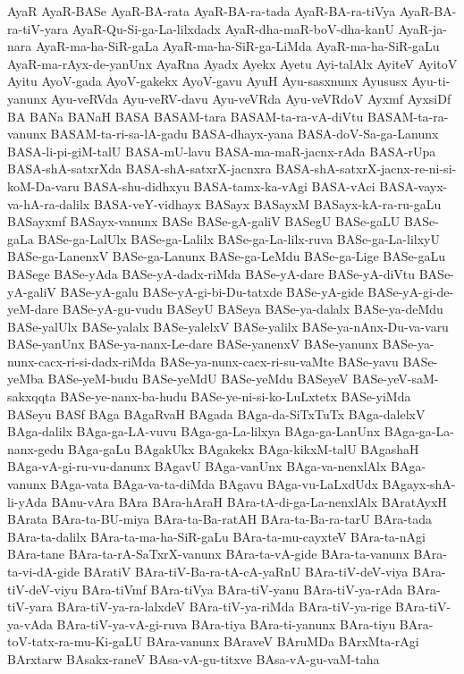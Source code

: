 {AyaR
AyaR-BASe
AyaR-BA-rata
AyaR-BA-ra-tada
AyaR-BA-ra-tiVya
AyaR-BA-ra-tiV-yara
AyaR-Qu-Si-ga-La-lilxdadx
AyaR-dha-maR-boV-dha-kanU
AyaR-ja-nara
AyaR-ma-ha-SiR-gaLa
AyaR-ma-ha-SiR-ga-LiMda
AyaR-ma-ha-SiR-gaLu
AyaR-ma-rAyx-de-yanUnx
AyaRna
Ayadx
Ayekx
Ayetu
Ayi-talAlx
AyiteV
AyitoV
Ayitu
AyoV-gada
AyoV-gakekx
AyoV-gavu
AyuH
Ayu-sasxnunx
Ayususx
Ayu-ti-yanunx
Ayu-veRVda
Ayu-veRV-davu
Ayu-veVRda
Ayu-veVRdoV
Ayxmf
AyxsiDf
BA
BANa
BANaH
BASA
BASAM-tara
BASAM-ta-ra-vA-diVtu
BASAM-ta-ra-vanunx
BASAM-ta-ri-sa-lA-gadu
BASA-dhayx-yana
BASA-doV-Sa-ga-Lanunx
BASA-li-pi-giM-talU
BASA-mU-lavu
BASA-ma-maR-jacnx-rAda
BASA-rUpa
BASA-shA-satxrXda
BASA-shA-satxrX-jacnxra
BASA-shA-satxrX-jacnx-re-ni-si-koM-Da-varu
BASA-shu-didhxyu
BASA-tamx-ka-vAgi
BASA-vAci
BASA-vayx-va-hA-ra-dalilx
BASA-veY-vidhayx
BASayx
BASayxM
BASayx-kA-ra-ru-gaLu
BASayxmf
BASayx-vanunx
BASe
BASe-gA-galiV
BASegU
BASe-gaLU
BASe-gaLa
BASe-ga-LalUlx
BASe-ga-Lalilx
BASe-ga-La-lilx-ruva
BASe-ga-La-lilxyU
BASe-ga-LanenxV
BASe-ga-Lanunx
BASe-ga-LeMdu
BASe-ga-Lige
BASe-gaLu
BASege
BASe-yAda
BASe-yA-dadx-riMda
BASe-yA-dare
BASe-yA-diVtu
BASe-yA-galiV
BASe-yA-galu
BASe-yA-gi-bi-Du-tatxde
BASe-yA-gide
BASe-yA-gi-de-yeM-dare
BASe-yA-gu-vudu
BASeyU
BASeya
BASe-ya-dalalx
BASe-ya-deMdu
BASe-yalUlx
BASe-yalalx
BASe-yalelxV
BASe-yalilx
BASe-ya-nAnx-Du-va-varu
BASe-yanUnx
BASe-ya-nanx-Le-dare
BASe-yanenxV
BASe-yanunx
BASe-ya-nunx-cacx-ri-si-dadx-riMda
BASe-ya-nunx-cacx-ri-su-vaMte
BASe-yavu
BASe-yeMba
BASe-yeM-budu
BASe-yeMdU
BASe-yeMdu
BASeyeV
BASe-yeV-saM-sakxqqta
BASe-ye-nanx-ba-hudu
BASe-ye-ni-si-ko-LuLxtetx
BASe-yiMda
BASeyu
BASf
BAga
BAgaRvaH
BAgada
BAga-da-SiTxTuTx
BAga-dalelxV
BAga-dalilx
BAga-ga-LA-vuvu
BAga-ga-La-lilxya
BAga-ga-LanUnx
BAga-ga-La-nanx-gedu
BAga-gaLu
BAgakUkx
BAgakekx
BAga-kikxM-talU
BAgashaH
BAga-vA-gi-ru-vu-danunx
BAgavU
BAga-vanUnx
BAga-va-nenxlAlx
BAga-vanunx
BAga-vata
BAga-va-ta-diMda
BAgavu
BAga-vu-LaLxdUdx
BAgayx-shA-li-yAda
BAnu-vAra
BAra
BAra-hAraH
BAra-tA-di-ga-La-nenxlAlx
BAratAyxH
BArata
BAra-ta-BU-miya
BAra-ta-Ba-ratAH
BAra-ta-Ba-ra-tarU
BAra-tada
BAra-ta-dalilx
BAra-ta-ma-ha-SiR-gaLu
BAra-ta-mu-cayxteV
BAra-ta-nAgi
BAra-tane
BAra-ta-rA-SaTxrX-vanunx
BAra-ta-vA-gide
BAra-ta-vanunx
BAra-ta-vi-dA-gide
BAratiV
BAra-tiV-Ba-ra-tA-cA-yaRnU
BAra-tiV-deV-viya
BAra-tiV-deV-viyu
BAra-tiVmf
BAra-tiVya
BAra-tiV-yanu
BAra-tiV-ya-rAda
BAra-tiV-yara
BAra-tiV-ya-ra-lalxdeV
BAra-tiV-ya-riMda
BAra-tiV-ya-rige
BAra-tiV-ya-vAda
BAra-tiV-ya-vA-gi-ruva
BAra-tiya
BAra-ti-yanunx
BAra-tiyu
BAra-toV-tatx-ra-mu-Ki-gaLU
BAra-vanunx
BAraveV
BAruMDa
BArxMta-rAgi
BArxtarw
BAsakx-raneV
BAsa-vA-gu-titxve
BAsa-vA-gu-vaM-taha
}
